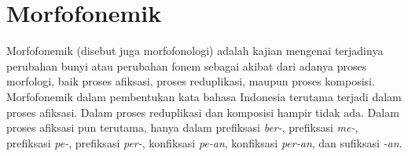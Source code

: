 






\section{Morfofonemik}
\label{sec:morfofonemik}

Morfofonemik (disebut juga morfofonologi) adalah kajian mengenai terjadinya perubahan bunyi atau perubahan fonem sebagai akibat dari adanya proses morfologi, baik proses afiksasi, proses reduplikasi, maupun proses komposisi\cite{chaer:08:morfologi}. Morfofonemik dalam pembentukan kata bahasa Indonesia terutama terjadi dalam proses afiksasi. Dalam proses reduplikasi dan komposisi hampir tidak ada. Dalam proses afiksasi pun terutama, hanya dalam prefiksasi \textit{ber-}, prefiksasi \textit{me-}, prefiksasi \textit{pe-}, prefiksasi \textit{per-}, konfiksasi \textit{pe-an}, konfiksasi \textit{per-an}, dan sufiksasi \textit{-an}. 

